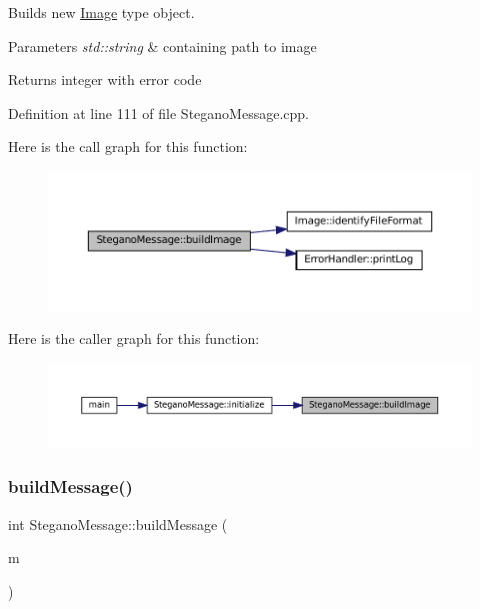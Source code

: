 Builds new \mbox{\hyperlink{classImage}{Image}} type object. 


\begin{DoxyParams}{Parameters}
{\em std\+::string} & containing path to image \\
\hline
\end{DoxyParams}
\begin{DoxyReturn}{Returns}
integer with error code 
\end{DoxyReturn}


Definition at line 111 of file Stegano\+Message.\+cpp.

Here is the call graph for this function\+:\nopagebreak
\begin{figure}[H]
\begin{center}
\leavevmode
\includegraphics[width=350pt]{classSteganoMessage_ad90a4cf8cf03febfb4c3df955ccab13d_cgraph}
\end{center}
\end{figure}
Here is the caller graph for this function\+:\nopagebreak
\begin{figure}[H]
\begin{center}
\leavevmode
\includegraphics[width=350pt]{classSteganoMessage_ad90a4cf8cf03febfb4c3df955ccab13d_icgraph}
\end{center}
\end{figure}
\mbox{\label{classSteganoMessage_a43a7d1579509a4004a86ad70dad10f65}} 
\subsubsection{\texorpdfstring{buildMessage()}{buildMessage()}}
{\footnotesize\ttfamily int Stegano\+Message\+::build\+Message (\begin{DoxyParamCaption}\item[{std\+::string}]{m }\end{DoxyParamCaption})}



